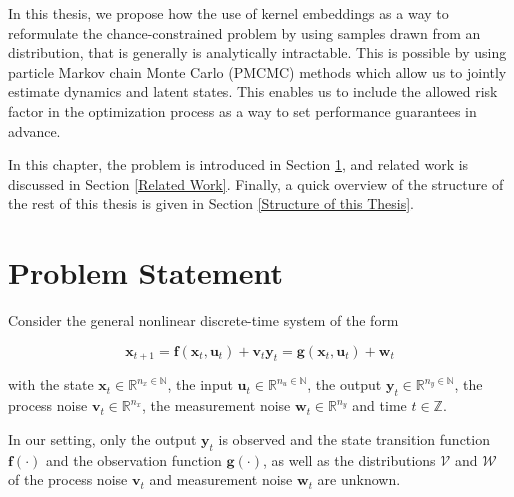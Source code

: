 In this thesis, we propose how the use of kernel embeddings \cite{Yassine_22} as a way to reformulate the chance-constrained problem by using samples drawn from an distribution, that is generally is analytically intractable. This is possible by using particle Markov chain Monte Carlo (PMCMC) methods which allow us to jointly estimate dynamics and latent states. This enables us to include the allowed risk factor in the optimization process as a way to set performance guarantees in advance.

In this chapter, the problem is introduced in Section \ref{Problem Statement}, and related work is discussed in Section \ref{Related Work}. Finally, a quick overview of the structure of the rest of this thesis is given in Section \ref{Structure of this Thesis}.

\section{Problem Statement} \label{Problem Statement}

Consider the general nonlinear discrete-time system of the form

\begin{subequations} \label{System equation}
\begin{equation}
\boldsymbol{x}_{t+1} = \boldsymbol{f} \left( \boldsymbol{x}_{t}, \boldsymbol{u}_t \right) + \boldsymbol{v}_{t}
\end{equation}
\begin{equation}
\boldsymbol{y}_{t} = \boldsymbol{g} \left( \boldsymbol{x}_{t}, \boldsymbol{u}_t \right) + \boldsymbol{w}_{t}
\end{equation}
\end{subequations}

with the state $\boldsymbol{x}_t \in \mathbb{R}^{n_x \in \mathbb{N}}$, the input $\boldsymbol{u}_t \in \mathbb{R}^{n_u \in \mathbb{N}}$, the output $\boldsymbol{y}_t \in \mathbb{R}^{n_y \in \mathbb{N}}$, the process noise $\boldsymbol{v}_{t} \in \mathbb{R}^{n_x}$, the measurement noise $\boldsymbol{w}_{t} \in \mathbb{R}^{n_y}$ and time $t \in \mathbb{Z}$. 

In our setting, only the output $\boldsymbol{y}_t$ is observed and the state transition function $\boldsymbol{f}(\cdot)$ and the observation function $\boldsymbol{g}(\cdot)$, as well as the distributions $\boldsymbol{\mathcal{V}}$ and $\boldsymbol{\mathcal{W}}$ of the process noise $\boldsymbol{v}_t$ and measurement noise $\boldsymbol{w}_t$ are unknown.

